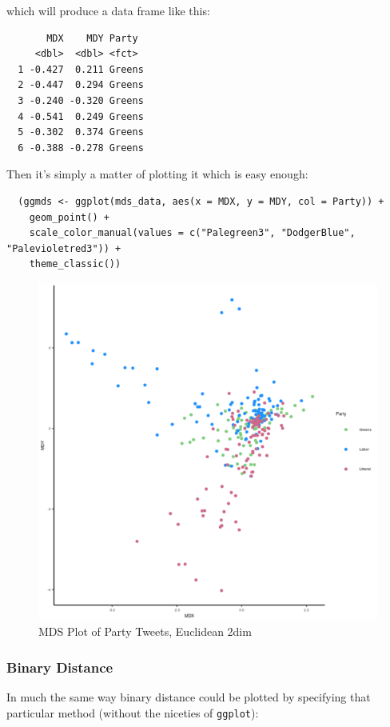 \documentclass[11pt]{article}
\begin{document}
which will produce a data frame like this:

\begin{verbatim}
       MDX    MDY Party
     <dbl>  <dbl> <fct>
  1 -0.427  0.211 Greens
  2 -0.447  0.294 Greens
  3 -0.240 -0.320 Greens
  4 -0.541  0.249 Greens
  5 -0.302  0.374 Greens
  6 -0.388 -0.278 Greens
\end{verbatim}

Then it's simply a matter of plotting it which is easy enough:

\begin{verbatim}
  (ggmds <- ggplot(mds_data, aes(x = MDX, y = MDY, col = Party)) +
    geom_point() +
    scale_color_manual(values = c("Palegreen3", "DodgerBlue", "Palevioletred3")) +
    theme_classic())
\end{verbatim}

\begin{figure}[htbp]
\centering
\includegraphics[width=.9\linewidth]{media/20200426094721532_1205049402.png}
\caption{MDS Plot of Party Tweets, Euclidean 2dim}
\end{figure}

\subsubsection{Binary Distance}
\label{sec:org132f928}
In much the same way binary distance could be plotted by specifying that
particular method (without the niceties of \texttt{ggplot}):
\end{document}
